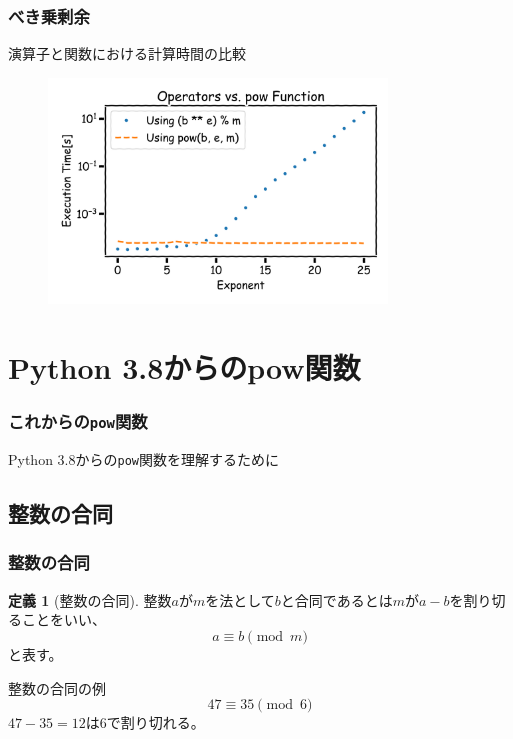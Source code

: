 \documentclass[aspectratio=169,dvipdfmx,14pt,notheorems]{beamer}
\theoremstyle{definition}
\newtheorem{definition}{定義}
\begin{document}
\begin{frame}[fragile]\frametitle{べき乗剰余}

\begin{exampleblock}{演算子と関数における計算時間の比較}
\begin{figure}
  \centering
  \includegraphics[width=9cm]{op_vs_func.png}
\end{figure}
\end{exampleblock}

\end{frame}


\section{Python 3.8からのpow関数}

\begin{frame}\frametitle{これからの\texttt{pow}関数}
\begin{center}
\Large Python 3.8からの\texttt{pow}関数を理解するために
\end{center}
\end{frame}

\subsection{整数の合同}

\begin{frame}\frametitle{整数の合同}

\begin{definition}[整数の合同]
整数$a$が$m$を法として$b$と合同であるとは$m$が$a-b$を割り切ることをいい、
\begin{equation*}
a \equiv b \pmod{m}
\end{equation*}
と表す。
\end{definition}

\begin{exampleblock}{整数の合同の例}
\begin{equation*}
47 \equiv 35 \pmod{6}
\end{equation*}
$47-35 = 12$は6で割り切れる。
\end{exampleblock}

\end{frame}
\end{document}
